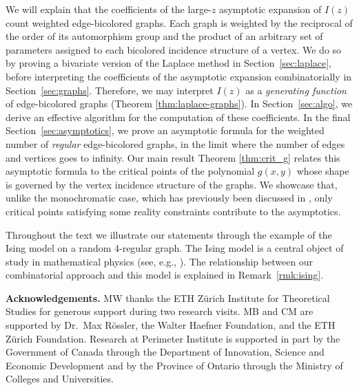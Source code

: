 \documentclass[english]{ourlematemasingle}
\numberwithin{theorem}{section}
\theoremstyle{remark}
\begin{document}
We will explain that the coefficients of the large-$z$ asymptotic expansion of $I(z)$ count weighted edge-bicolored graphs.  Each graph is weighted by the reciprocal of the order of its automorphism group and the product of an arbitrary set of parameters assigned to each bicolored incidence structure of a vertex.  We do so by proving a bivariate version of the Laplace method in Section~\ref{sec:laplace}, before interpreting the coefficients of the asymptotic expansion combinatorially in Section~\ref{sec:graphs}.  Therefore, we may interpret $I(z)$ as a \emph{generating function} of edge-bicolored graphs (Theorem \ref{thm:laplace-graphs}).
In Section~\ref{sec:algo}, we derive an effective algorithm for the computation of these coefficients. In the final Section~\ref{sec:asymptotics}, we prove an asymptotic formula for the weighted number of \emph{regular} edge-bicolored graphs, in the limit where the number of edges and vertices goes to infinity.
Our main result Theorem \ref{thm:crit_g} relates this asymptotic formula to the critical points of the polynomial $g(x,y)$ whose shape is governed by the vertex incidence structure of the graphs. We showcase that, unlike the monochromatic case, which has previously been discussed in \cite[Ch.~3]{Borinsky:2018mdl}, only critical points satisfying some reality constraints contribute to the asymptotics.\par 

Throughout the text we illustrate our statements through the example of the Ising model on a random 4-regular graph. The Ising model is a central object of study in mathematical physics (see, e.g., \cite{MR4680248}). The relationship between our combinatorial approach and this model is explained in Remark~\ref{rmk:ising}.\par\medskip

\textbf{Acknowledgements.} 
MW thanks the ETH Zürich Institute for Theoretical Studies for generous support during two research visits.
MB and CM are supported by Dr.\ Max Rössler, the Walter Haefner Foundation, and the ETH Zürich Foundation. 
Research at Perimeter Institute is supported in part by the Government of Canada
through the Department of Innovation, Science and Economic Development and by
the Province of Ontario through the Ministry of Colleges and Universities.
\end{document}
